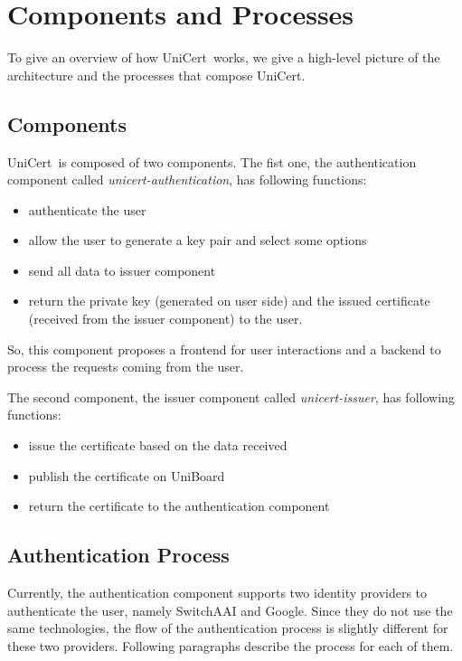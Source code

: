 \documentclass[oneside]{scrreprt}
\newcommand{\uniboard}{\mbox{UniBoard}}
\newcommand{\unicert}{\mbox{UniCert}}
\begin{document}
\chapter{Components and Processes} \label{chap:process}

To give an overview of how \unicert\ works, we give a high-level picture of the architecture and the processes that compose \unicert.

\section{Components}

\unicert\ is composed of two components. The fist one, the authentication component called \textit{unicert-authentication}, has following functions:
\begin{itemize}
\item authenticate the user
\item allow the user to generate a key pair and select some options
\item send all data to issuer component
\item return the private key (generated on user side) and the issued certificate (received from the issuer component) to the user.
\end{itemize}
So, this component proposes a frontend for user interactions and a backend to process the requests coming from the user.

The second component, the issuer component called \textit{unicert-issuer}, has following functions:
\begin{itemize}
\item issue the certificate based on the data received
\item publish the certificate on \uniboard
\item return the certificate to the authentication component
\end{itemize}

\section{Authentication Process} \label{sec:auth_process}


Currently, the authentication component supports two identity providers to authenticate the user, namely SwitchAAI and Google. Since they do not use the same technologies, the flow of the authentication process is slightly different for these two providers. Following paragraphs describe the process for each of them.
\end{document}
